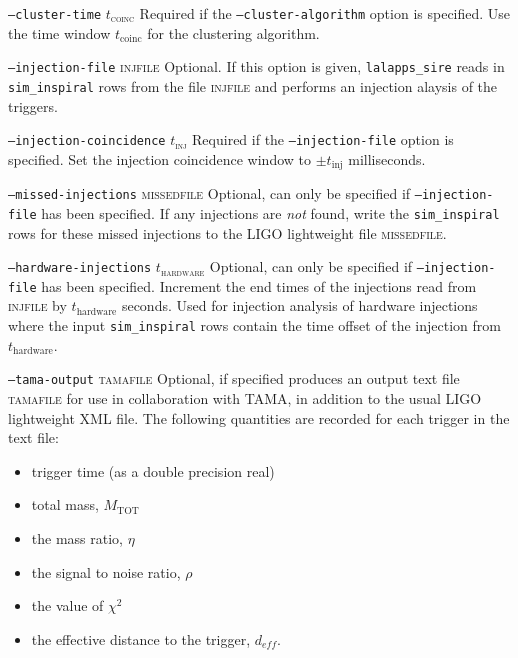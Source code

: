 \begin{entry}
\begin{entry}
\item[\texttt{--cluster-time} \textsc{$t_\mathrm{coinc}$}] Required if the 
\texttt{--cluster-algorithm} option is specified. Use the time window
$t_\mathrm{coinc}$ for the clustering algorithm.

\item[\texttt{--injection-file} \textsc{injfile}] Optional. If this option is
given, \verb$lalapps_sire$ reads in \verb$sim_inspiral$ rows from the file
\textsc{injfile} and performs an injection alaysis of the triggers.

\item[\texttt{--injection-coincidence} \textsc{$t_\mathrm{inj}$}] Required if
the \texttt{--injection-file} option is specified. Set the injection
coincidence window to $\pm t_\mathrm{inj}$ milliseconds.

\item[\texttt{--missed-injections} \textsc{missedfile}] Optional, can only be
specified if \texttt{--injection-file} has been specified. If any injections
are \emph{not} found, write the \verb$sim_inspiral$ rows for these missed
injections to the LIGO lightweight file \textsc{missedfile}.

\item[\texttt{--hardware-injections} \textsc{$t_\mathrm{hardware}$}] Optional,
can only be specified if \texttt{--injection-file} has been specified.
Increment the end times of the injections read from \textsc{injfile} by
$t_\mathrm{hardware}$ seconds. Used for injection analysis of hardware
injections where the input \verb$sim_inspiral$ rows contain the time offset of
the injection from  $t_\mathrm{hardware}$.

\item[\texttt{--tama-output} \textsc{tamafile}] Optional, if specified produces
an output text file \textsc{tamafile} for use in collaboration with TAMA, in
addition to the usual LIGO lightweight XML file.  The following quantities are
recorded for each trigger in the text file:

\begin{itemize}
\item trigger time (as a double precision real)
\item total mass, $M_{\mathrm{TOT}}$
\item the mass ratio, $\eta$
\item the signal to noise ratio, $\rho$
\item the value of $\chi^2$
\item the effective distance to the trigger, $d_{eff}$.
\end{itemize}



\end{entry}
\end{entry}
